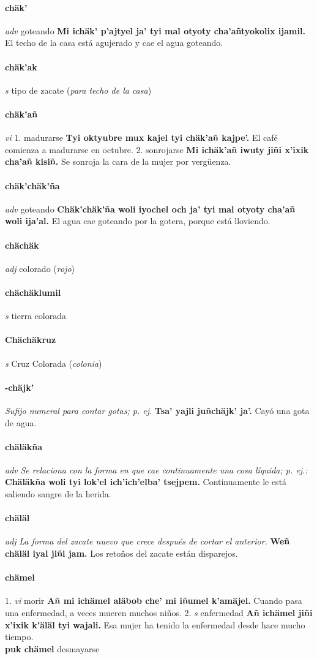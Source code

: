 \documentclass{scrbook}
\newcommand{\entry}[1]{\paragraph{#1}}
\newcommand{\onedefinition}[1]{#1.}
\newcommand{\nontranslationdef}[1]{\textit{#1}}
\newcommand{\partofspeech}[1]{\textit{#1}}
\newcommand{\spanishtranslation}[1]{#1}
\newcommand{\clarification}[1]{(\textit{#1})}
\newcommand{\cholexample}[1]{\textbf{#1}}
\newcommand{\exampletranslation}[1]{#1}
\newcommand{\secondaryentry}[1]{\\\textbf{#1}}
\newcommand{\secondtranslation}[1]{#1}
\begin{document}
\begin{multicols}{2}
\entry{chäk'}
\partofspeech{adv}
\spanishtranslation{goteando}
\cholexample{Mi ichäk' p'ajtyel ja' tyi mal otyoty cha'añtyokolix ijamil.}
\exampletranslation{El techo de la casa está agujerado y cae el agua goteando.}

\entry{chäk'ak}
\partofspeech{s}
\spanishtranslation{tipo de zacate}
\clarification{para techo de la casa}

\entry{chäk'añ}
\partofspeech{vi}
\onedefinition{1}
\spanishtranslation{madurarse}
\cholexample{Tyi oktyubre mux kajel tyi chäk'añ kajpe'.}
\exampletranslation{El café comienza a madurarse en octubre.}
\onedefinition{2}
\spanishtranslation{sonrojarse}
\cholexample{Mi ichäk'añ iwuty jiñi x'ixik cha'añ kisiñ.}
\exampletranslation{Se sonroja la cara de la mujer por vergüenza.}

\entry{chäk'chäk'ña}
\partofspeech{adv}
\spanishtranslation{goteando}
\cholexample{Chäk'chäk'ña woli iyochel och ja' tyi mal otyoty cha'añ woli ija'al.}
\exampletranslation{El agua cae goteando por la gotera, porque está lloviendo.}

\entry{chächäk}
\partofspeech{adj}
\spanishtranslation{colorado}
\clarification{rojo}

\entry{chächäklumil}
\partofspeech{s}
\spanishtranslation{tierra colorada}

\entry{Chächäkruz}
\partofspeech{s}
\spanishtranslation{Cruz Colorada}
\clarification{colonia}

\entry{-chäjk'}
\nontranslationdef{Sufijo numeral para contar gotas; p. ej.}
\cholexample{Tsa' yajli juñchäjk' ja'.}
\exampletranslation{Cayó una gota de agua.}

\entry{chäläkña}
\partofspeech{adv}
\nontranslationdef{Se relaciona con la forma en que cae continuamente una cosa líquida; p. ej.:}
\cholexample{Chäläkña woli tyi lok'el ich'ich'elba' tsejpem.}
\exampletranslation{Continuamente le está saliendo sangre de la herida.}

\entry{chäläl}
\partofspeech{adj}
\nontranslationdef{La forma del zacate nuevo que crece después de cortar el anterior.}
\cholexample{Weñ chäläl iyal jiñi jam.}
\exampletranslation{Los retoños del zacate están disparejos.}

\entry{chämel}
\onedefinition{1}
\partofspeech{vi}
\spanishtranslation{morir}
\cholexample{Añ mi ichämel aläbob che' mi iñumel k'amäjel.}
\exampletranslation{Cuando pasa una enfermedad, a veces mueren muchos niños.}
\onedefinition{2}
\partofspeech{s}
\spanishtranslation{enfermedad}
\cholexample{Añ ichämel jiñi x'ixik k'äläl tyi wajali.}
\exampletranslation{Esa mujer ha tenido la enfermedad desde hace mucho tiempo.}
\secondaryentry{puk chämel}
\secondtranslation{desmayarse}


\end{multicols}
\end{document}
